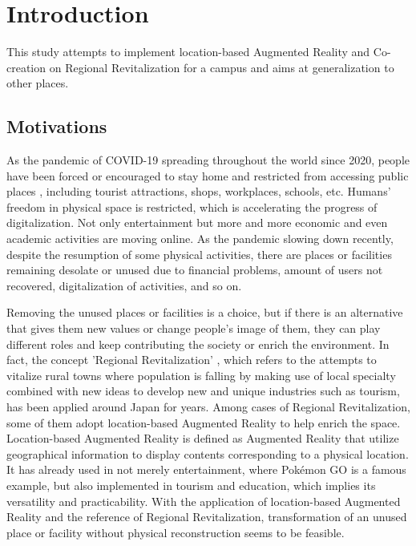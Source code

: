 \chapter{Introduction}

This study attempts to implement location-based Augmented Reality and Co-creation on Regional Revitalization for a campus and aims at generalization to other places.

\section{Motivations}

As the pandemic of COVID-19 spreading throughout the world since 2020,
people have been forced or encouraged to stay home and restricted from accessing public places \cite{sandford_2020} \cite{hirsch_2020},
including tourist attractions, shops, workplaces, schools, etc.
Humans' freedom in physical space is restricted, which is accelerating the progress of digitalization.
Not only entertainment but more and more economic and even academic activities are moving online.
As the pandemic slowing down recently, despite the resumption of some physical activities,
there are places or facilities remaining desolate or unused due to financial problems,
amount of users not recovered, digitalization of activities, and so on.

Removing the unused places or facilities is a choice, but if there is an alternative that gives them new values or change people's image of them,
they can play different roles and keep contributing the society or enrich the environment.
In fact, the concept 'Regional Revitalization' \cite{japangov} \cite{sawaji_2019}, which refers to the attempts to vitalize rural towns where population is falling
by making use of local specialty combined with new ideas to develop new and unique industries such as tourism, has been applied around Japan for years.
Among cases of Regional Revitalization, some of them adopt location-based Augmented Reality to help enrich the space.
Location-based Augmented Reality is defined as Augmented Reality that utilize geographical information to display contents corresponding to a physical location.
It has already used in not merely entertainment, where Pokémon GO is a famous example,
but also implemented in tourism and education, which implies its versatility and practicability.
With the application of location-based Augmented Reality and the reference of Regional Revitalization,
transformation of an unused place or facility without physical reconstruction seems to be feasible.

